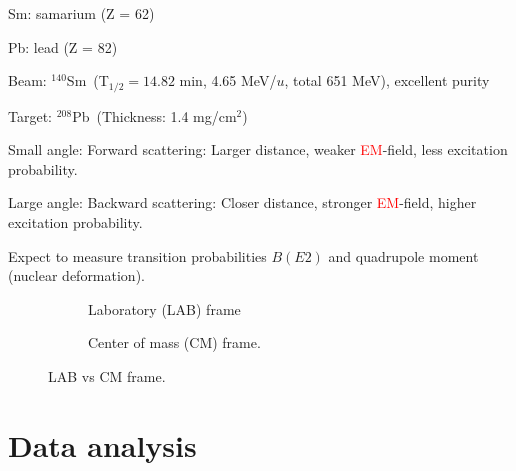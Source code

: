 \documentclass[twoside,english]{uiofysmaster/uiofysmaster}
\newcommand{\Sm}{$^{140}$Sm} %
\newcommand{\Pb}{$^{208}$Pb}
\begin{document}
Sm: samarium (Z = 62)

Pb: lead (Z = 82) \newline



Beam: \Sm ~(T$_{1/2} = 14.82$ min, 4.65 MeV/$u$, total 651 MeV), excellent purity

Target: \Pb ~(Thickness: 1.4 mg/cm$^2$)


Small angle: Forward scattering: Larger distance, weaker \textcolor{red}{EM}-field, less excitation probability.

Large angle: Backward scattering: Closer distance, stronger \textcolor{red}{EM}-field, higher excitation probability. \newline


\bigskip

Expect to measure transition probabilities $B(E2)$ and quadrupole moment (nuclear deformation). 

\bigskip


\begin{figure}
	\centering
	\begin{subfigure}{\textwidth}
		
		\caption{Laboratory (LAB) frame}
		\label{fig:LAB}
	\end{subfigure}
	\begin{subfigure}{\textwidth}
		
		\caption{Center of mass (CM) frame.}
		\label{fig:CM}
	\end{subfigure}
	\caption{LAB vs CM frame.}
	\label{fig:LAB-CM}
\end{figure}





\chapter{Data analysis}  
\end{document}
